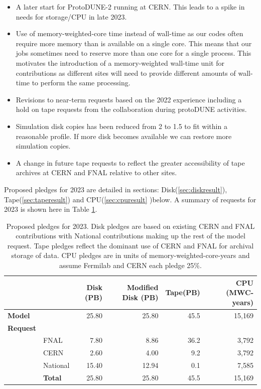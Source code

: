 \documentclass[12pt]{article}
\begin{document}
\begin{itemize}
\item A later start for ProtoDUNE-2 running at CERN. This leads to a spike in needs for storage/CPU in late 2023. 
\item Use of memory-weighted-core time instead of wall-time as our codes often require more memory than is available on a single core.  This means that our jobs sometimes need to reserve more than one core for a single process. This motivates the introduction of a memory-weighted wall-time unit for contributions  as different sites will  need to provide different amounts of wall-time to perform the same processing. 
\item Revisions to near-term requests based on the 2022 experience including a hold on tape requests from the collaboration during protoDUNE activities. 
\item Simulation disk copies has been reduced from 2 to 1.5 to fit within a reasonable profile.  If more disk becomes available we can restore more simulation copies.  
\item A change in future tape requests to reflect the greater accessibility of tape archives at CERN and FNAL relative to other sites. 
\end{itemize}

Proposed pledges for 2023 are detailed  in sections: Disk(\ref{sec:diskresult}), Tape(\ref{sec:taperesult}) and CPU(\ref{sec:cpuresult} )below.   A summary of requests for 2023 is shown here in Table \ref{tab:summary2023}.

\begin{table}[ht]
\begin{centering}

\begin{tabular}{|ll|rr|r|r|}
\hline
 	&&	Disk (PB)	&	Modified Disk (PB)	&	Tape(PB)	&	CPU (MWC-years)	\\
	\hline
{\bf Model}	&&	25.80	&	25.80	&	45.5	&	15,169	\\
\hline
{\bf Request}	&&		&		&		&		\\
&FNAL	&	7.80	&	8.86	&	36.2	&	3,792	\\
&CERN	&	2.60	&	4.00	&	9.2	&	3,792	\\
&National	&	15.40	&	12.94	&	0.1	&	7,585\\
\hline
&{\bf Total}	&	25.80	&	25.80	&	45.5	&	15,169	\\
\hline
\end{tabular}

\caption{Proposed pledges for 2023.  Disk pledges are based on existing CERN and FNAL contributions with National contributions making up the rest of the model request.  Tape pledges reflect the dominant use of CERN and FNAL for archival storage of data.  CPU pledges are in units of memory-weighted-core-years and assume Fermilab and CERN each pledge 25\%.   }
\end{centering}
\label{tab:summary2023}
\end{table}
\end{document}
